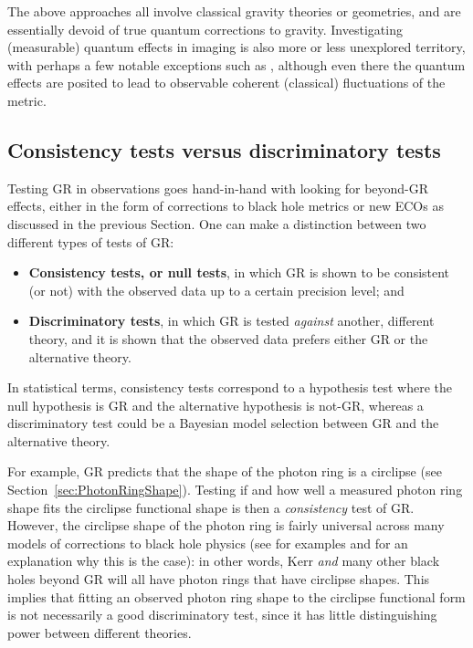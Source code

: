 \documentclass[graybox,envcountchap]{svmult}
\begin{document}
The above approaches all involve classical gravity theories or geometries, and are essentially devoid of true quantum corrections to gravity.
Investigating (measurable) quantum effects in imaging is also more or less unexplored territory, with perhaps a few notable exceptions such as \cite{Giddings2018}, although even there the quantum effects are posited to lead to observable coherent (classical) fluctuations of the metric.

\subsection{Consistency tests versus discriminatory tests}
\label{sec:NullTests}

Testing GR in observations goes hand-in-hand with looking for beyond-GR effects, either in the form of corrections to black hole metrics or new ECOs as discussed in the previous Section.
One can make a distinction between two different types of tests of GR:
\begin{itemize}
    \item \textbf{Consistency tests, or null tests}, in which GR is shown to be consistent (or not) with the observed data up to a certain precision level; and
    \item \textbf{Discriminatory tests}, in which GR is tested \emph{against} another, different theory, and it is shown that the observed data prefers either GR or the alternative theory.
\end{itemize}
In statistical terms, consistency tests correspond to a hypothesis test  where the null hypothesis is GR and the alternative hypothesis is not-GR, whereas a discriminatory test could be a Bayesian model selection between GR and the alternative theory.

For example, GR predicts that the shape of the photon ring is a circlipse (see Section~\ref{sec:PhotonRingShape}).
Testing if and how well a measured photon ring shape fits the circlipse functional shape is then a \emph{consistency} test of GR.
However, the circlipse shape of the photon ring is fairly universal across many models of corrections to black hole physics (see \cite{Staelens2023} for examples and \cite{universality} for an explanation why this is the case): in other words, Kerr \emph{and} many other black holes beyond GR will all have photon rings that have circlipse shapes.
This implies that fitting an observed photon ring shape to the circlipse functional form is not necessarily a good discriminatory test, since it has little distinguishing power between different theories.
\end{document}

